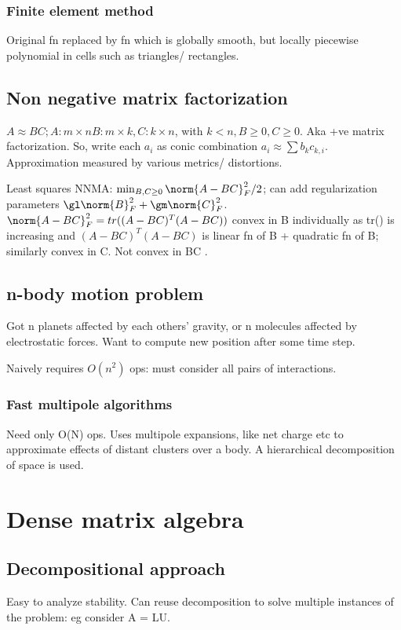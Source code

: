 \documentclass[oneside, article]{memoir}
\begin{document}
\section{Finite element method}
Original fn replaced by fn which is globally smooth, but locally piecewise polynomial in cells such as triangles/ rectangles.

\chapter{Non negative matrix factorization}
$A \approx BC; A: m \times n B: m \times k, C: k \times n$, with $k< n, B \geq 0 , C \geq 0$. Aka +ve matrix factorization. So, write each $a_{i}$ as conic combination $a_{i} \approx \sum b_{k}c_{k,i}$. Approximation measured by various metrics/ distortions.

Least squares NNMA: $\min_{B, C \geq 0} \norm{A - BC}_{F}^{2}/2$; can add regularization parameters $\gl \norm{B}_{F}^{2} + \gm \norm{C}_{F}^{2}$. $\norm{A - BC}_{F}^{2} = tr((A-BC)^{T}(A-BC))$ convex in B individually as tr() is increasing and $(A-BC)^{T}(A-BC)$ is linear fn of B + quadratic fn of B; similarly convex in C. Not convex in BC \why.

\tbc

\chapter{n-body motion problem}
Got n planets affected by each others' gravity, or n molecules affected by electrostatic forces. Want to compute new position after some time step.

Naively requires $O(n^{2})$ ops: must consider all pairs of interactions.

\section{Fast multipole algorithms}
Need only O(N) ops. Uses multipole expansions, like net charge etc to approximate effects of distant clusters over a body. A hierarchical decomposition of space is used.

\part{Dense matrix algebra}
\chapter{Decompositional approach}
Easy to analyze stability. Can reuse decomposition to solve multiple instances of the problem: eg consider A = LU.
\end{document}

